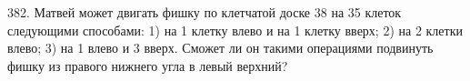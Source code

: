 382.  Матвей может двигать фишку по клетчатой доске 38 на 35 клеток следующими способами:
1) на 1 клетку влево и на 1 клетку вверх; 2) на 2 клетки влево; 3) на 1 влево и 3 вверх.
Сможет ли он такими операциями подвинуть фишку из правого нижнего угла в левый верхний?\\
